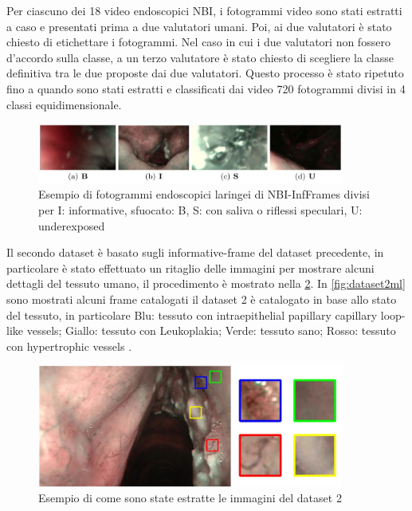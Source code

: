 Per ciascuno dei 18 video endoscopici NBI, i fotogrammi video sono stati estratti a caso e
presentati prima a due valutatori umani. Poi, ai due valutatori è stato chiesto di etichettare i fotogrammi. Nel caso in cui i due
valutatori non fossero d'accordo sulla classe, a un terzo valutatore è stato
chiesto di scegliere la classe definitiva tra le due proposte
dai due valutatori. Questo processo è stato ripetuto fino a quando sono stati estratti e classificati dai video 720 fotogrammi divisi in 4 classi equidimensionale.

\begin{figure}[ht]
    \centering
    \includegraphics[width=0.9\textwidth]{introduzione/Larynge.jpg}
    \caption[Esempio di fotogrammi endoscopici laringei di NBI-InfFrames]{Esempio di fotogrammi endoscopici laringei di NBI-InfFrames divisi per I: informative, sfuocato: B, S: con
    saliva o riflessi speculari,
    U: underexposed}
    \label{fig:larynges-2}
\end{figure}

Il secondo dataset è basato sugli informative-frame del dataset precedente, in particolare è stato effettuato un ritaglio delle immagini per mostrare   alcuni dettagli del tessuto umano, il procedimento è mostrato nella \cref{fig:dataset2}. In \cref{fig:dataset2ml} sono mostrati alcuni frame catalogati il dataset 2 è catalogato in base allo stato del tessuto, in particolare Blu: tessuto con intraepithelial papillary capillary loop-like vessels; Giallo: tessuto con Leukoplakia;
Verde: tessuto sano; Rosso: tessuto con hypertrophic vessels \cite{moccia_larynge}.

\begin{figure}[ht]
    \centering
    \includegraphics[width=0.9\textwidth]{introduzione/dataset-2.JPG}
    \caption{Esempio di come sono state estratte le immagini del dataset 2}
    \label{fig:dataset2}
\end{figure}

